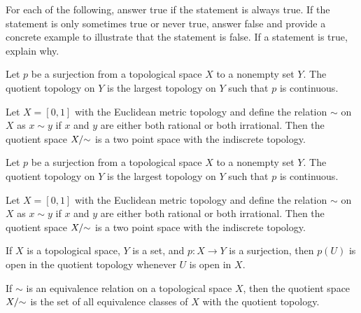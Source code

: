 \item For each of the following, answer true if the statement is always true. If the statement is only sometimes true or never true, answer false and provide a concrete example to illustrate that the statement is false. If a statement is true, explain why. 
	\ba
	\item Let $p$ be a surjection from a topological space $X$ to a nonempty set $Y$. The quotient topology on $Y$ is the largest topology on $Y$ such that $p$ is continuous. 
	
	\item Let $X = [0,1]$ with the Euclidean metric topology and define the relation $\sim$ on $X$ as $x \sim y$ if $x$ and $y$ are either both rational or both irrational. Then the quotient space $X/\hspace{-1mm}\sim$ is a two point space with the indiscrete topology. 

\item Let $p$ be a surjection from a topological space $X$ to a nonempty set $Y$. The quotient topology on $Y$ is the largest topology on $Y$ such that $p$ is continuous. 
	
	\item Let $X = [0,1]$ with the Euclidean metric topology and define the relation $\sim$ on $X$ as $x \sim y$ if $x$ and $y$ are either both rational or both irrational. Then the quotient space $X/\hspace{-1mm}\sim$ is a two point space with the indiscrete topology. 

	\item If $X$ is a topological space, $Y$ is a set, and $p: X \to Y$ is a surjection, then $p(U)$ is open in the quotient topology whenever $U$ is open in $X$.

	\item If $\sim$ is an equivalence relation on a topological space $X$, then the quotient space $X/\hspace{-1mm}\sim$ is the set of all equivalence classes of $X$ with the quotient topology. 
		
	\ea

